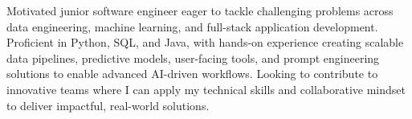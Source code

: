 

\begin{cvparagraph}

Motivated junior software engineer eager to tackle challenging problems across data engineering, machine learning, and full-stack application development. Proficient in Python, SQL, and Java, with hands-on experience creating scalable data pipelines, predictive models, user-facing tools, and prompt engineering solutions to enable advanced AI-driven workflows. Looking to contribute to innovative teams where I can apply my technical skills and collaborative mindset to deliver impactful, real-world solutions.
\end{cvparagraph}
